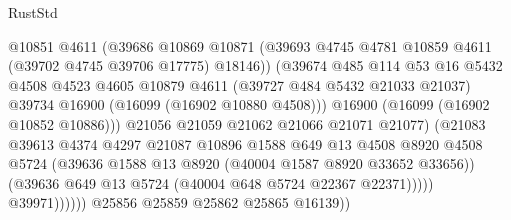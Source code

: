 \begin{lexlean}{RustStd}
\begin{coremodule}
                                      @10851
                                      @4611
                                      (@39686
                                        @10869
                                        @10871
                                        (@39693
                                          @4745
                                          @4781
                                          @10859
                                          @4611
                                          (@39702 @4745 @39706 @17775)
                                          @18146))
                                      (@39674
                                        @485
                                        @114
                                        @53
                                        @16
                                        @5432
                                        @4508
                                        @4523
                                        @4605
                                        @10879
                                        @4611
                                        (@39727 @484 @5432 @21033 @21037)
                                        @39734
                                        @16900
                                        (@16099 (@16902 @10880 @4508)))
                                      @16900
                                      (@16099 (@16902 @10852 @10886)))
                                    @21056
                                    @21059
                                    @21062
                                    @21066
                                    @21071
                                    @21077)
                                  (@21083
                                    @39613
                                    @4374
                                    @4297
                                    @21087
                                    @10896
                                    @1588
                                    @649
                                    @13
                                    @4508
                                    @8920
                                    @4508
                                    @5724
                                    (@39636 @1588 @13 @8920 (@40004 @1587 @8920 @33652 @33656))
                                    (@39636 @649 @13 @5724 (@40004 @648 @5724 @22367 @22371)))))
                              @39971))))))
                  @25856
                  @25859
                  @25862
                  @25865
                  @16139))

\end{coremodule}
\end{lexlean}
